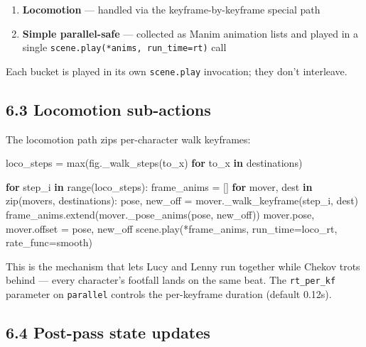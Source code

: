 \documentclass[
  12pt,
  letterpaper,
]{book}
\newenvironment{Shaded}{}{}
\newcommand{\BuiltInTok}[1]{\textcolor[rgb]{0.00,0.50,0.00}{#1}}
\newcommand{\ControlFlowTok}[1]{\textcolor[rgb]{0.00,0.44,0.13}{\textbf{#1}}}
\newcommand{\KeywordTok}[1]{\textcolor[rgb]{0.00,0.44,0.13}{\textbf{#1}}}
\newcommand{\NormalTok}[1]{#1}
\newcommand{\OperatorTok}[1]{\textcolor[rgb]{0.40,0.40,0.40}{#1}}
\providecommand{\tightlist}{%
  \setlength{\itemsep}{0pt}\setlength{\parskip}{0pt}}
\begin{document}
\begin{enumerate}
\def\labelenumi{\arabic{enumi}.}
\tightlist
\item
  \textbf{Locomotion} --- handled via the keyframe-by-keyframe special
  path
\item
  \textbf{Simple parallel-safe} --- collected as Manim animation lists
  and played in a single \texttt{scene.play(*anims,\ run\_time=rt)} call
\end{enumerate}

Each bucket is played in its own \texttt{scene.play} invocation; they
don't interleave.

\subsection{6.3 Locomotion sub-actions}\label{locomotion-sub-actions}

The locomotion path zips per-character walk keyframes:

\begin{Shaded}
\begin{Highlighting}[]
\NormalTok{loco\_steps }\OperatorTok{=} \BuiltInTok{max}\NormalTok{(fig.\_walk\_steps(to\_x) }\ControlFlowTok{for}\NormalTok{ to\_x }\KeywordTok{in}\NormalTok{ destinations)}

\ControlFlowTok{for}\NormalTok{ step\_i }\KeywordTok{in} \BuiltInTok{range}\NormalTok{(loco\_steps):}
\NormalTok{    frame\_anims }\OperatorTok{=}\NormalTok{ []}
    \ControlFlowTok{for}\NormalTok{ mover, dest }\KeywordTok{in} \BuiltInTok{zip}\NormalTok{(movers, destinations):}
\NormalTok{        pose, new\_off }\OperatorTok{=}\NormalTok{ mover.\_walk\_keyframe(step\_i, dest)}
\NormalTok{        frame\_anims.extend(mover.\_pose\_anims(pose, new\_off))}
\NormalTok{        mover.pose, mover.offset }\OperatorTok{=}\NormalTok{ pose, new\_off}
\NormalTok{    scene.play(}\OperatorTok{*}\NormalTok{frame\_anims, run\_time}\OperatorTok{=}\NormalTok{loco\_rt, rate\_func}\OperatorTok{=}\NormalTok{smooth)}
\end{Highlighting}
\end{Shaded}

This is the mechanism that lets Lucy and Lenny run together while Chekov
trots behind --- every character's footfall lands on the same beat. The
\texttt{rt\_per\_kf} parameter on \texttt{parallel} controls the
per-keyframe duration (default 0.12s).

\subsection{6.4 Post-pass state updates}\label{post-pass-state-updates}
\end{document}
